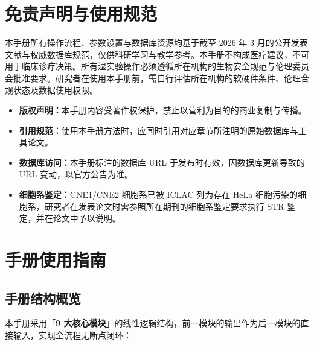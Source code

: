 \documentclass[12pt,a4paper,twoside]{article}
\begin{document}
\setcounter{page}{1}

\section*{免责声明与使用规范}

本手册所有操作流程、参数设置与数据库资源均基于截至 2026 年 3 月的公开发表文献与权威数据库规范，仅供科研学习与教学参考。本手册不构成医疗建议，不可用于临床诊疗决策。所有湿实验操作必须遵循所在机构的生物安全规范与伦理委员会批准要求。研究者在使用本手册前，需自行评估所在机构的软硬件条件、伦理合规状态及数据使用权限。

\begin{itemize}
  \item \textbf{版权声明：}本手册内容受著作权保护，禁止以营利为目的的商业复制与传播。
  \item \textbf{引用规范：}使用本手册方法时，应同时引用对应章节所注明的原始数据库与工具论文。
  \item \textbf{数据库访问：}本手册标注的数据库 URL 于发布时有效，因数据库更新导致的 URL 变动，以官方公告为准。
  \item \textbf{细胞系鉴定：}CNE1/CNE2 细胞系已被 ICLAC 列为存在 HeLa 细胞污染的细胞系，研究者在发表论文时需参照所在期刊的细胞系鉴定要求执行 STR 鉴定，并在论文中予以说明。
\end{itemize}

\clearpage

\section*{手册使用指南}

\subsection*{手册结构概览}

本手册采用「\textbf{9 大核心模块}」的线性逻辑结构，前一模块的输出作为后一模块的直接输入，实现全流程无断点闭环：
\end{document}
